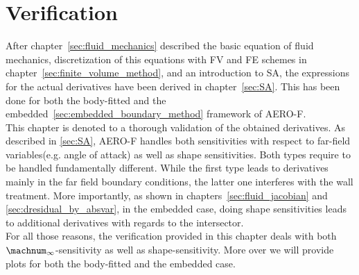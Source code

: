 \documentclass[../main.tex]{subfiles}
\begin{document}
\setlength{\delimitershortfall}{0pt}

\chapter{Verification}\label{sec:verification}
\minitoc

After chapter~\ref{sec:fluid_mechanics} described the basic equation of fluid mechanics, discretization of this equations with \ac{FV} and \ac{FE} schemes in chapter~\ref{sec:finite_volume_method}, and an introduction to \ac{SA}, the expressions for the actual derivatives have been derived in chapter~\ref{sec:SA}. This has been done for both the body-fitted and the embedded~\ref{sec:embedded_boundary_method} framework of AERO-F.\\
This chapter is denoted to a thorough validation of the obtained derivatives. As described in \ref{sec:SA}, AERO-F handles both sensitivities with respect to far-field variables(e.g. angle of attack) as well as shape sensitivities. Both types require to be handled fundamentally different. While the first type leads to derivatives mainly in the far field boundary conditions, the latter one interferes with the wall treatment. More importantly, as shown in chapters~\ref{sec:fluid_jacobian} and \ref{sec:dresidual_by_absvar}, in the embedded case, doing shape sensitivities leads to additional derivatives with regards to the intersector.\\
For all those reasons, the verification provided in this chapter deals with both $\machnum_{\infty}$-sensitivity as well as shape-sensitivity. More over we will provide plots for both the body-fitted and the embedded case.
\end{document}
